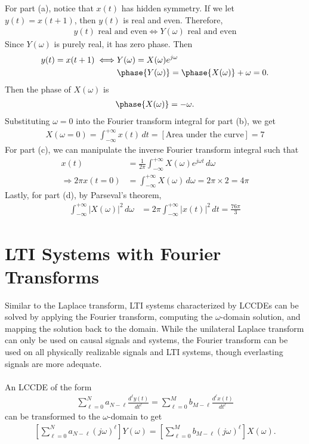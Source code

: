 \documentclass{report}
\begin{document}
\begin{solution}
    For part (a), notice that $x(t)$ has hidden symmetry. If we let $y(t) = x(t+1)$, then $y(t)$ is real and even. Therefore, 
    \begin{align*}
        y(t) \text{ real and even} \iff Y(\omega) \text{ real and even}
    \end{align*}
    Since $Y(\omega)$ is purely real, it has zero phase. Then
    \begin{align*}
        y(t) = x(t+1) \iff &Y(\omega) = X(\omega)e^{j\omega} \\
        &\phase{Y(\omega)} = \phase{X(\omega)} + \omega = 0.
    \end{align*}
    Then the phase of $X(\omega)$ is 
    \begin{align*}
        \phase{X(\omega)} = -\omega.
    \end{align*}
    Substituting $\omega=0$ into the Fourier transform integral for part (b), we get 
    \begin{align*}
        X(\omega=0) = \int_{-\infty}^{+\infty} x(t) \,dt = [\text{Area under the curve}] = 7
    \end{align*}
    For part (c), we can manipulate the inverse Fourier transform integral such that 
    \begin{align*}
        x(t) &= \frac{1}{2\pi}\int_{-\infty}^{+\infty} X(\omega)e^{j\omega t} \,d\omega \\
        \Longrightarrow 2\pi x(t=0) &= \int_{-\infty}^{+\infty} X(\omega) \,d\omega = 2\pi \times 2 = 4\pi
    \end{align*}
    Lastly, for part (d), by Parseval's theorem, 
    \begin{align*}
        \int_{-\infty}^{+\infty} |X(\omega)|^2 \,d\omega &= 2\pi\int_{-\infty}^{+\infty} |x(t)|^2 \,dt = \frac{76\pi}{3}
    \end{align*}
\end{solution}

\section{LTI Systems with Fourier Transforms}
Similar to the Laplace transform, LTI systems characterized by LCCDEs can be solved by applying the Fourier transform, computing the $\omega$-domain solution, 
and mapping the solution back to the domain. While the unilateral Laplace transform can only be used on causal signals and systems, the Fourier transform 
can be used on all physically realizable signals and LTI systems, though everlasting signals are more adequate.
\\ \\
An LCCDE of the form 
\begin{align}
    \sum_{\ell=0}^{N} a_{N-\ell} \frac{d^{\ell} y(t)}{dt^{\ell}} = \sum_{\ell=0}^{M} b_{M-\ell} \frac{d^{\ell} x(t)}{dt^{\ell}}
\end{align}
can be transformed to the $\omega$-domain to get 
\begin{align}
    \left[\sum_{\ell=0}^{N} a_{N-\ell} (j\omega)^{\ell}\right]Y(\omega) = \left[\sum_{\ell=0}^{M} b_{M-\ell} (j\omega)^{\ell}\right]X(\omega).
\end{align}
\end{document}
